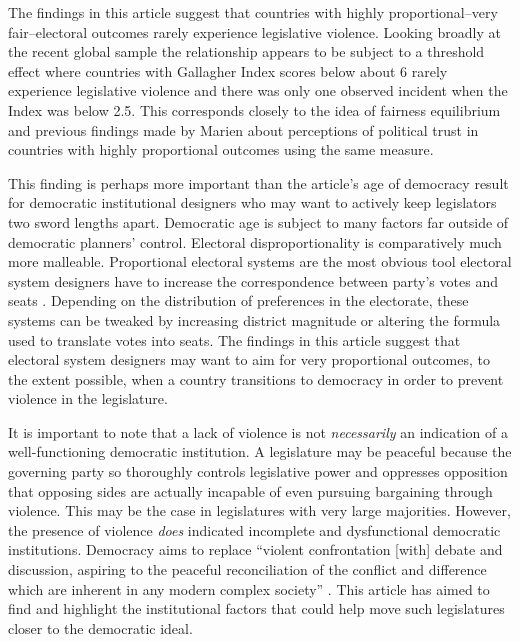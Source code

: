 \documentclass[a4paper]{article}\usepackage[]{graphicx}\usepackage[]{color}
\begin{document}
The findings in this article suggest that countries with highly proportional--very fair--electoral outcomes rarely experience legislative violence. Looking broadly at the recent global sample the relationship appears to be subject to a threshold effect where countries with Gallagher Index scores below about 6 rarely experience legislative violence and there was only one observed incident when the Index was below 2.5. This corresponds closely to the idea of fairness equilibrium and previous findings made by Marien \citeyearpar{Marien2011} about perceptions of political trust in countries with highly proportional outcomes using the same measure.

This finding is perhaps more important than the article's age of democracy result for democratic institutional designers who may want to actively keep legislators two sword lengths apart. Democratic age is subject to many factors far outside of democratic planners' control. Electoral disproportionality is comparatively much more malleable. Proportional electoral systems are the most obvious tool electoral system designers have to increase the correspondence between party's votes and seats \citep{Carey2011}. Depending on the distribution of preferences in the electorate, these systems can be tweaked by increasing district magnitude or altering the formula used to translate votes into seats. The findings in this article suggest that electoral system designers may want to aim for very proportional outcomes, to the extent possible, when a country transitions to democracy in order to prevent violence in the legislature.

It is important to note that a lack of violence is not \emph{necessarily} an indication of a well-functioning democratic institution. A legislature may be peaceful because the governing party so thoroughly controls legislative power and oppresses opposition that opposing sides are actually incapable of even pursuing bargaining through violence. This may be the case in legislatures with very large majorities. However, the presence of violence \emph{does} indicated incomplete and dysfunctional democratic institutions. Democracy aims to replace ``violent confrontation [with] debate and discussion, aspiring to the peaceful reconciliation of the conflict and difference which are inherent in any modern complex society'' \cite[220]{Schwarzmantel2010}. This article has aimed to find and highlight the institutional factors that could help move such legislatures closer to the democratic ideal.
\end{document}
